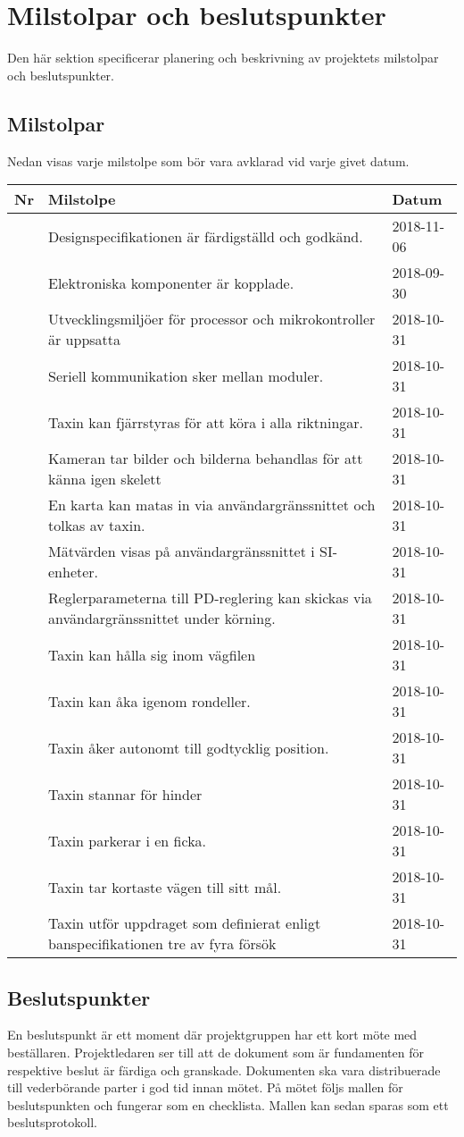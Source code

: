 \documentclass[projektplan/plan.tex]{subfiles}
\newcounter{milestoneNo} %
\newenvironment{milestonelist}
{
    \setlength{\tabcolsep}{12pt}
    \renewcommand{\arraystretch}{1.6}
    \begin{longtable}{p{8mm}p{105mm}p{25mm}}
        \bfseries Nr &
        \bfseries Milstolpe &
        \bfseries Datum 
	\\\hline\endhead
}{
    \end{longtable}
}
\newcommand{\milestone}[2]{
    \stepcounter{milestoneNo}
    \arabic{milestoneNo} & #1     & #2 \\
}
\begin{document}
\section{Milstolpar och beslutspunkter}
Den här sektion specificerar planering och beskrivning av projektets milstolpar
och beslutspunkter.

\subsection{Milstolpar}
Nedan visas varje milstolpe som bör vara avklarad vid varje givet datum.
\begin{milestonelist}
    \milestone{Designspecifikationen är färdigställd och godkänd.}{2018-11-06}
    \milestone{Elektroniska komponenter är kopplade.}{2018-09-30}
    \milestone{Utvecklingsmiljöer för processor och mikrokontroller är
    uppsatta}{2018-10-31}
    \milestone{Seriell kommunikation sker mellan moduler.}{2018-10-31}
    \milestone{Taxin kan fjärrstyras för att köra i alla
    riktningar.}{2018-10-31}
    \milestone{Kameran tar bilder och bilderna behandlas för att känna igen
    skelett}{2018-10-31}
    \milestone{En karta kan matas in via användargränssnittet och tolkas av
    taxin.}{2018-10-31}
    \milestone{Mätvärden visas på användargränssnittet i
    SI-enheter.}{2018-10-31}
    \milestone{Reglerparameterna till PD-reglering kan skickas via
    användargränssnittet under körning.}{2018-10-31}
    \milestone{Taxin kan hålla sig inom vägfilen}{2018-10-31}
    \milestone{Taxin kan åka igenom rondeller.}{2018-10-31}
    \milestone{Taxin åker autonomt till godtycklig position.}{2018-10-31}
    \milestone{Taxin stannar för hinder}{2018-10-31}
    \milestone{Taxin parkerar i en ficka.}{2018-10-31}
    \milestone{Taxin tar kortaste vägen till sitt mål.}{2018-10-31}
    \milestone{Taxin utför uppdraget som definierat enligt banspecifikationen
    tre av fyra försök}{2018-10-31}
\end{milestonelist}

\subsection{Beslutspunkter}
En beslutspunkt är ett moment där projektgruppen har ett kort möte med
beställaren. Projektledaren ser till att de dokument som är fundamenten för
respektive beslut är färdiga och granskade. Dokumenten ska vara distribuerade
till vederbörande parter i god tid innan mötet. På mötet följs mallen för
beslutspunkten och fungerar som en checklista. Mallen kan sedan sparas som ett
beslutsprotokoll.
\end{document}
